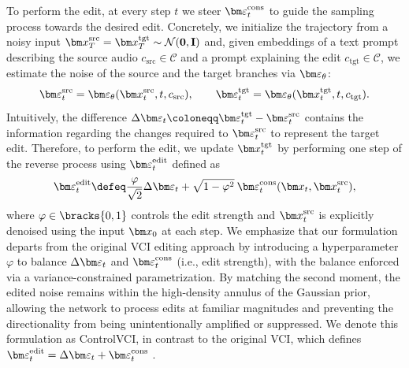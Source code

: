To perform the edit, at every step $t$ we steer $\eps_t^{\mathrm{cons}}$ to guide the sampling process towards the desired edit. Concretely, we initialize the trajectory from a noisy input $\x_T^{\mathrm{src}} = \x_T^{\mathrm{tgt}} \sim \mathcal{N}(\mathbf{0}, \mathbf{I})$ and, given embeddings of a text prompt describing the source audio $c_{\mathrm{src}}\in\mathcal{C}$ and a prompt explaining the edit $c_{\mathrm{tgt}}\in\mathcal{C}$, we estimate the noise of the source and the target branches via $\eps_\theta$:
\[
\eps_t^{\mathrm{src}} = \eps_\theta(\x_t^{\mathrm{src}}, t, c_{\mathrm{src}}), \qquad
\eps_t^{\mathrm{tgt}} = \eps_\theta(\x_t^{\mathrm{tgt}}, t, c_{\mathrm{tgt}}).
\]
Intuitively, the difference $\Delta\eps_t \coloneqq \eps^{\mathrm{tgt}}_t - \eps^{\mathrm{src}}_t$ contains the information regarding the changes required to $\eps_t^{\mathrm{src}}$ to represent the target edit. Therefore, to perform the edit, we update $\x_t^{\mathrm{tgt}}$ by performing one step of the reverse process using $\eps_t^{\mathrm{edit}}$ defined as
\begin{align}\label{eq:controlvci}
    \eps_t^{\mathrm{edit}}\defeq\frac{\varphi}{\sqrt{2}}\Delta\eps_t+\sqrt{1-\varphi^2}\:\eps_t^{\mathrm{cons}}(\x_t, \x^{\mathrm{src}}_t),
\end{align}
where $\varphi\in\bracks{0,1}$ controls the edit strength and $\x_t^{\mathrm{src}}$ is explicitly denoised using the input $\x_0$ at each step. We emphasize that our formulation departs from the original VCI editing approach by introducing a hyperparameter $\varphi$ to balance $\Delta\eps_t$ and $\eps_t^\mathrm{cons}$ (i.e., edit strength), with the balance enforced via a variance-constrained parametrization. By matching the second moment, the edited noise remains within the high-density annulus of the Gaussian prior, allowing the network to process edits at familiar magnitudes and preventing the directionality from being unintentionally amplified or suppressed. We denote this formulation as ControlVCI, in contrast to the original VCI, which defines ${\eps_t^{\mathrm{edit}}=\Delta\eps_t+\eps_t^{\mathrm{cons}}}$ \cite{infedit}.

